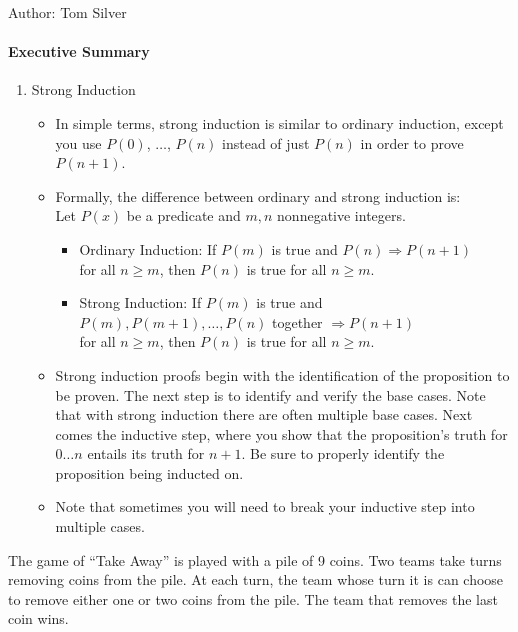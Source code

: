 \documentclass[solution, letterpaper]{cs20inclass}
\begin{document}

\noindent Author: Tom Silver%

\paragraph*{Executive Summary}

\begin{enumerate}
\item Strong Induction
\begin{itemize}
\item In simple terms, strong induction is similar to ordinary induction, except you use $P(0)$, $\ldots$, $P(n)$ instead of just $P(n)$ in order to prove $P(n+1)$.
\item Formally, the difference between ordinary and strong induction is:\\
Let $P(x)$ be a predicate and $m,n$ nonnegative integers.
    \begin{itemize}
    \item Ordinary Induction: If $P(m)$ is true and $P(n) \Rightarrow P(n+1)$\\ for all $n \geq m$, then $P(n)$ is true for all $n      \geq m$.
    \item Strong Induction: If $P(m)$ is true and\\ $P(m), P(m+1), \dots, P(n)$ together $\Rightarrow P(n+1)$\\
    for all $n \geq m$, then $P(n)$ is true for all $n \geq m$.
    \end{itemize}
\item Strong induction proofs begin with the identification of the proposition to be proven. The next step is to identify and verify the base cases. Note that with strong induction there are often multiple base cases. Next comes the inductive step, where you show that the proposition's truth for $0\ldots n$ entails its truth for $n+1$. Be sure to properly identify the proposition being inducted on.  
\item Note that sometimes you will need to break your inductive step into multiple cases.
\end{itemize}
\end{enumerate}

\problem

The game of ``Take Away'' is played with a pile of 9 coins. Two teams take turns removing coins from the pile. At each turn, the team whose turn it is can choose to remove either one or two coins from the pile. The team that removes the last coin wins. 
\end{document}
